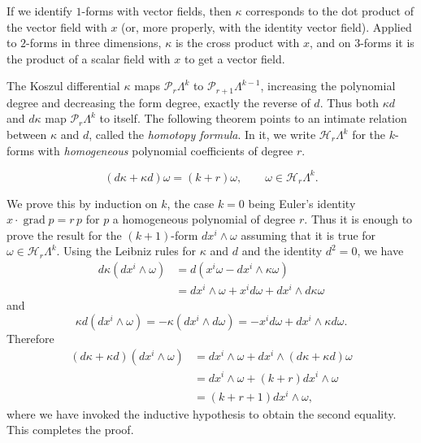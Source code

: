 {If we identify $1$-forms with vector fields, then $\kappa$ corresponds to the dot product of the vector field with $x$ (or, more properly, with the identity vector field). Applied to $2$-forms in three dimensions, $\kappa$ is the cross product with $x$, and on $3$-forms it is the product of a scalar field with $x$ to get a vector field.}

{The Koszul differential $\kappa$ maps $\mathcal P_r\Lambda^k$ to $\mathcal P_{r+1}\Lambda^{k-1}$, increasing the polynomial degree and decreasing the form degree, exactly the reverse of $d$. Thus both $\kappa d$ and $d\kappa$ map $\mathcal P_r\Lambda^k$ to itself. The following theorem points to an intimate relation between $\kappa$ and $d$, called the \emph{homotopy formula}. In it, we write $\mathcal H_r\Lambda^k$ for the $k$-forms with \emph{homogeneous} polynomial coefficients of degree $r$.}

\begin{Theorem}\label{thm:koszul-homotopy}
\[
(d\kappa+\kappa d)\omega=(k+r)\omega,\qquad\omega\in\mathcal H_r\Lambda^k.
\]
\end{Theorem}

\begin{Proof}
{We prove this by induction on $k$, the case $k=0$ being Euler's identity $x\cdot\operatorname{grad}p=r\,p$ for $p$ a homogeneous polynomial of degree $r$. Thus it is enough to prove the result for the $(k+1)$-form $dx^i\wedge\omega$ assuming that it is true for $\omega\in\mathcal H_r\Lambda^k$. Using the Leibniz rules for $\kappa$ and $d$ and the identity $d^2=0$, we have}
\[
\begin{aligned}
d\kappa(dx^i\wedge\omega)&=d(x^i\omega-dx^i\wedge\kappa\omega)\\
&=dx^i\wedge\omega+x^i d\omega+dx^i\wedge d\kappa\omega
\end{aligned}
\]
{and}
\[
\kappa d(dx^i\wedge\omega)=-\kappa(dx^i\wedge d\omega)=-x^i d\omega+dx^i\wedge\kappa d\omega.
\]
{Therefore}
\[
\begin{aligned}
(d\kappa+\kappa d)(dx^i\wedge\omega)&=dx^i\wedge\omega+dx^i\wedge(d\kappa+\kappa d)\omega\\
&=dx^i\wedge\omega+(k+r)dx^i\wedge\omega\\
&=(k+r+1)dx^i\wedge\omega,
\end{aligned}
\]
{where we have invoked the inductive hypothesis to obtain the second equality. This completes the proof.}
\end{Proof}

